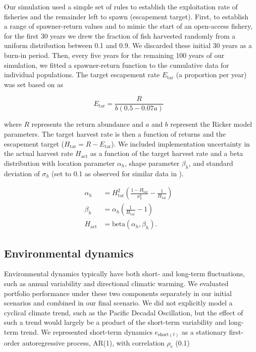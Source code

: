 \documentclass[12pt,english]{article}
\begin{document}
\begin{spacing}{1.3}
Our simulation used a simple set of rules to establish the exploitation rate of fisheries and the remainder left to spawn (escapement target). First, to establish a range of spawner-return values and to mimic the start of an open-access fishery, for the first 30 years we drew the fraction of fish harvested randomly from a uniform distribution between 0.1 and 0.9. We discarded these initial 30 years as a burn-in period. Then, every five years for the remaining 100 years of our simulation, we fitted a spawner-return function to the cumulative data for individual populations. The target escapement rate $E_{\mathrm{tar}}$ (a proportion per year) was set based on \citet{hilborn1992} as

\[E_{\mathrm{tar}} = \frac{R}{b (0.5 - 0.07a)} \label{eq:esc}\]

\noindent
where $R$ represents the return abundance and $a$ and $b$ represent the Ricker model parameters. The target harvest rate is then a function of returns and the escapement target ($H_{\mathrm{tar}} = R - E_{\mathrm{tar}}$). We included implementation uncertainty in the actual harvest rate $H_{\mathrm{act}}$ as a function of the target harvest rate and a beta distribution with location parameter $\alpha_h$, shape parameter $\beta_h$, and standard deviation of $\sigma_h$ (set to 0.1 as observed for similar data in \citet{pestes2008}).

\[\begin{aligned}
\alpha_h &= H_{\mathrm{tar}}^2 \left( \frac{1 -
H_{\mathrm{tar}}}{\sigma_h^2} - \frac{1}{H_{\mathrm{tar}}} \right)\\ \beta_h
&= \alpha_h \left({\frac{1}{H_{\mathrm{tar}}} - 1}\right)\\
H_{\mathrm{act}} &= \mathrm{beta}(\alpha_h, \beta_h).
\end{aligned}\]

\subsection{Environmental dynamics}\label{environmental-dynamics}

Environmental dynamics typically have both short- and long-term fluctuations, such as annual variability and directional climatic warming. We evaluated portfolio performance under these two components separately in our initial scenarios and combined in our final scenario. We did not explicitly model a cyclical climate trend, such as the Pacific Decadal Oscillation, but the effect of such a trend would largely be a product of the short-term variability and long-term trend. We represented short-term dynamics $e_{\mathrm{short}(t)}$ as a stationary first-order autoregressive process, AR(1), with correlation $\rho_e$ (0.1)


\end{spacing}
\end{document}
